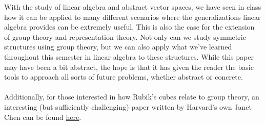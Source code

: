 \documentclass[twoside]{article}
\begin{document}
\begin{spacing}{1.25}
With the study of linear algebra and abstract vector spaces, we have seen 
in class how it can be applied to many different scenarios where the generalizations 
linear algebra provides can be extremely useful. This is also the case for 
the extension of group theory and representation theory. Not only can we study 
symmetric structures using group theory, but we can also apply what we've learned 
throughout this semester in linear algebra to these structures. While this paper 
may have been a bit abstract, the hope is that it has given the reader the basic 
tools to approach all sorts of future problems, whether abstract or concrete. 

\paragraph*{} Additionally, for those interested in how Rubik's cubes relate to group theory, an interesting 
(but sufficiently challenging) paper written by Harvard's own Janet Chen can be found
\href{https://people.math.harvard.edu/~jjchen/docs/Group%20Theory%20and%20the%20Rubik's%20Cube.pdf}{here}.


\newpage

\nocite{*}
\printbibliography
\end{spacing}
\end{document}
